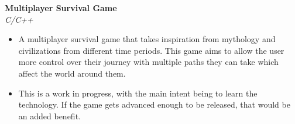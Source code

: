 \documentclass[a4paper]{article}
\begin{document}
            {\textbf{Multiplayer Survival Game}}\\
            \textit{C/C++}
            \vspace{-1mm}
            \begin{itemize} \itemsep 1pt
            
                    \item A multiplayer survival game that takes inspiration from mythology and civilizations from different time periods. This game aims to allow the user more control over their journey with multiple paths they can take which affect the world around them.
                
                    \item This is a work in progress, with the main intent being to learn the technology. If the game gets advanced enough to be released, that would be an added benefit.
                
            \end{itemize}
            \vspace*{2mm}
            
\end{document}
